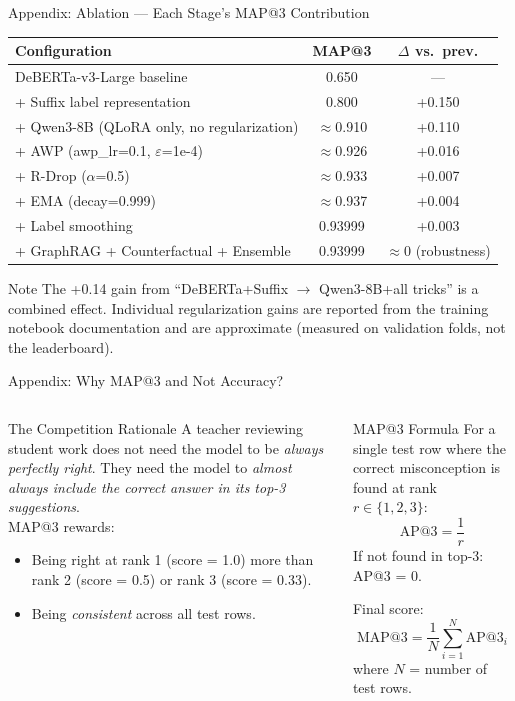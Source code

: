 \documentclass[aspectratio=169]{beamer}
\begin{document}
\begin{frame}{Appendix: Ablation --- Each Stage's MAP@3 Contribution}
\small
\begin{center}
\setlength{\tabcolsep}{8pt}
\renewcommand{\arraystretch}{1.3}
\begin{tabular}{lcc}
\toprule
\textbf{Configuration} & \textbf{MAP@3} & \textbf{$\Delta$ vs.\ prev.}\\
\midrule
DeBERTa-v3-Large baseline & 0.650 & ---\\
+ Suffix label representation & 0.800 & +0.150\\
+ Qwen3-8B (QLoRA only, no regularization) & $\approx$0.910 & +0.110\\
+ AWP (awp\_lr=0.1, $\varepsilon$=1e-4) & $\approx$0.926 & +0.016\\
+ R-Drop ($\alpha$=0.5) & $\approx$0.933 & +0.007\\
+ EMA (decay=0.999) & $\approx$0.937 & +0.004\\
+ Label smoothing & 0.93999 & +0.003\\
+ GraphRAG + Counterfactual + Ensemble & 0.93999 & $\approx$0 (robustness)\\
\bottomrule
\end{tabular}
\end{center}
\vspace{8pt}
\begin{block}{Note}
The +0.14 gain from ``DeBERTa+Suffix $\to$ Qwen3-8B+all tricks'' is a combined effect. Individual regularization gains are reported from the training notebook documentation and are approximate (measured on validation folds, not the leaderboard).
\end{block}
\end{frame}

\begin{frame}{Appendix: Why MAP@3 and Not Accuracy?}
\begin{columns}[T]
\begin{block}{The Competition Rationale}
A teacher reviewing student work does not need the model to be \textit{always perfectly right}. They need the model to \textit{almost always include the correct answer in its top-3 suggestions}.\\[6pt]
MAP@3 rewards:
\begin{itemize}
  \item Being right at rank 1 (score = 1.0) more than rank 2 (score = 0.5) or rank 3 (score = 0.33).
  \item Being \textit{consistent} across all test rows.
\end{itemize}
\end{block}
\begin{block}{MAP@3 Formula}
For a single test row where the correct misconception is found at rank $r \in \{1, 2, 3\}$:
\[
  \text{AP@3} = \frac{1}{r}
\]
If not found in top-3: AP@3 = 0.

Final score:
\[
  \text{MAP@3} = \frac{1}{N}\sum_{i=1}^{N} \text{AP@3}_i
\]
where $N$ = number of test rows.
\end{block}
\end{columns}
\end{frame}
\end{document}
